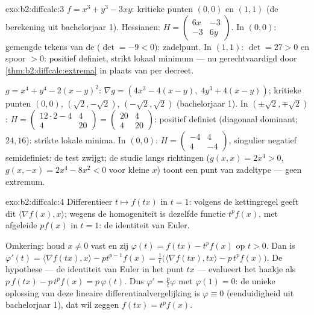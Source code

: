 \begin{solution}{exo:b2:diffcalc:3}
$f = x^3 + y^3 - 3xy$: kritieke punten $(0,0)$ en $(1,1)$ (de
berekening uit bachelorjaar 1). Hessianen: $H = \begin{pmatrix} 6x
& -3\\ -3 & 6y\end{pmatrix}$. In $(0,0)$: gemengde tekens van de
 ($\det = -9 < 0$): zadelpunt. In $(1,1)$: $\det = 27 >
0$ en spoor $> 0$: positief definiet, strikt lokaal minimum --- nu
gerechtvaardigd door \cref{thm:b2:diffcalc:extrema} in plaats van
per decreet.

$g = x^4 + y^4 - 2(x-y)^2$: $\nabla g = (4x^3 - 4(x - y),\; 4y^3 +
4(x-y))$; kritieke punten $(0,0)$, $(\sqrt2, -\sqrt2)$, $(-\sqrt2,
\sqrt2)$ (bachelorjaar 1). In $(\pm\sqrt2, \mp\sqrt2)$: $H =
\begin{pmatrix} 12\cdot2 - 4 & 4\\ 4 & 20\end{pmatrix} =
\begin{pmatrix} 20 & 4\\ 4 & 20\end{pmatrix}$: positief definiet
(diagonaal dominant;  $24, 16$): strikte lokale minima.
In $(0,0)$: $H = \begin{pmatrix} -4 & 4\\ 4 & -4\end{pmatrix}$,
singulier negatief semidefiniet: de test zwijgt; de studie langs
richtingen ($g(x,x) = 2x^4 > 0$, $g(x,-x) = 2x^4 - 8x^2 < 0$ voor
kleine $x$) toont een punt van zadeltype --- geen extremum.
\end{solution}

\begin{solution}{exo:b2:diffcalc:4}
Differentieer $t \mapsto f(tx)$ in $t = 1$: volgens de kettingregel
geeft dit $\langle \nabla f(x), x\rangle$; wegens de homogeniteit
is dezelfde functie $t^pf(x)$, met afgeleide $pf(x)$ in $t = 1$: de
identiteit van Euler.

Omkering: houd $x \neq 0$ vast en zij $\varphi(t) = f(tx) - t^p
f(x)$ op $t > 0$. Dan is $\varphi'(t) = \langle\nabla f(tx),
x\rangle - pt^{p-1}f(x) = \frac1t\bigl(\langle \nabla f(tx),
tx\rangle - p\,t^pf(x)\bigr)$. De hypothese --- de identiteit van
Euler in het punt $tx$ --- evalueert het haakje als $p\,f(tx) -
p\,t^pf(x) = p\,\varphi(t)$. Dus $\varphi' = \frac{p}{t}\varphi$
met $\varphi(1) = 0$: de unieke oplossing van deze lineaire
differentiaalvergelijking is $\varphi \equiv 0$ (eenduidigheid uit
bachelorjaar 1), dat wil zeggen $f(tx) = t^pf(x)$.
\end{solution}

